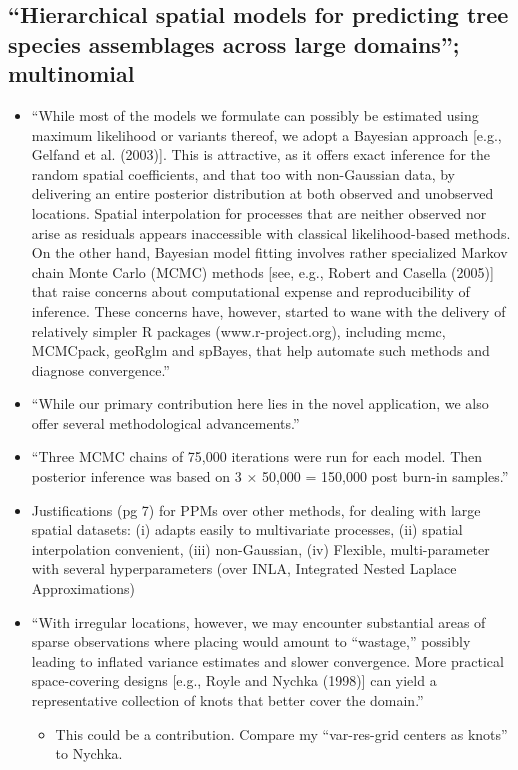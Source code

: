 \documentclass{article}
\begin{document}
\subsection*{``Hierarchical spatial models for predicting tree species assemblages across large domains''\citep{Finley2009_2}; multinomial}
\begin{itemize}
\item ``While most of the models we formulate can possibly be estimated using maximum likelihood or variants thereof, we adopt a Bayesian approach [e.g., Gelfand et al. (2003)]. This is attractive, as it offers exact inference for the random spatial coefficients, and that too with non-Gaussian data, by delivering an entire posterior distribution at both observed and unobserved locations. Spatial interpolation for processes that are neither observed nor arise as residuals appears inaccessible with classical likelihood-based methods. On the other hand, Bayesian model fitting involves rather specialized Markov chain Monte Carlo (MCMC) methods [see, e.g., Robert and Casella (2005)] that raise concerns about computational expense and reproducibility of inference. These concerns have, however, started to wane with the delivery of relatively simpler R packages (www.r-project.org), including mcmc, MCMCpack, geoRglm and spBayes, that help automate such methods and diagnose convergence.''
\item ``While our primary contribution here lies in the novel application, we also offer several methodological advancements.''
\item ``Three MCMC chains of 75,000 iterations were run for each model. Then posterior inference was based on 3 × 50,000 = 150,000 post burn-in samples.''
\item Justifications (pg 7) for PPMs over other methods, for dealing with large spatial datasets: (i) adapts easily to multivariate processes, (ii) spatial interpolation convenient, (iii) non-Gaussian, (iv) Flexible, multi-parameter with several hyperparameters (over INLA, Integrated Nested Laplace Approximations)
\item ``With irregular locations, however, we may encounter substantial areas of sparse observations where placing would amount to “wastage,” possibly leading to inflated variance estimates and slower convergence. More practical space-covering designs [e.g., Royle and Nychka (1998)] can yield a representative collection of knots that better cover the domain.''
    \begin{itemize}
    \item This could be a contribution. Compare my ``var-res-grid centers as knots'' to Nychka.

\end{itemize}
\end{itemize}
\end{document}
